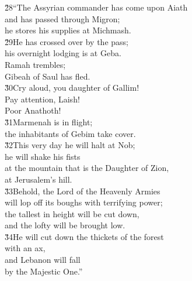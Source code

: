 \begin{poetry}
\poeml \v{28}``The Assyrian commander has come upon Aiath \\
\poemll    and has passed through Migron; \\
\poemlll       he stores his supplies at Michmash. \\
\poeml \v{29}He has crossed over by the pass; \\
\poemll    his overnight lodging is at Geba. \\
\poeml Ramah trembles; \\
\poemll    Gibeah of Saul has fled. \\
\poeml \v{30}Cry aloud, you daughter of Gallim! \\
\poemll    Pay attention, Laish! \\
\poemlll       Poor Anathoth! \\
\poeml \v{31}Marmenah is in flight; \\
\poemll    the inhabitants of Gebim take cover. \\
\poeml \v{32}This very day he will halt at Nob; \\
\poemll    he will shake his fists \\
\poeml at the mountain that is the Daughter of Zion, \\
\poemll    at Jerusalem's hill. \\
\poeml \v{33}Behold, the Lord  of the Heavenly Armies \\
\poemll    will lop off its boughs with terrifying power; \\
\poeml the tallest in height will be cut down, \\
\poemll    and the lofty will be brought low. \\
\poeml \v{34}He will cut down the thickets of the forest \\
\poemll    with an ax, \\
\poeml and Lebanon will fall \\
\poemll    by the Majestic One.''
\end{poetry}

